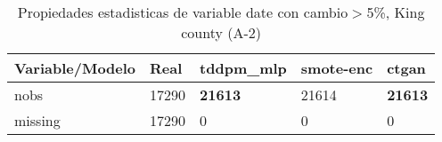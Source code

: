 \begin{table}[H]
\centering
\fontsize{8}{14}\selectfont
\caption{Propiedades estadisticas de variable date con cambio\ensuremath{>}5\%, King county (A-2)}
\label{table-stats-king county-a-2-date-short}
\begin{tabular}{|l|m{10em}|m{10em}|m{10em}|m{10em}|}
\hline
 \rowcolor[gray]{0.8}
Variable/Modelo & Real & tddpm\_mlp & smote-enc & ctgan \\
\hline nobs & 17290 & \bfseries 21613 & \cellcolor[rgb]{0.9, 0.54, 0.52} 21614 & \bfseries 21613 \\
\hline missing & 17290 & 0 & 0 & 0 \\
\hline
\end{tabular}
\end{table}
